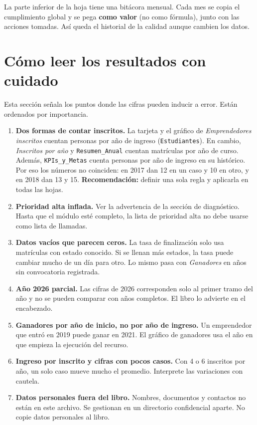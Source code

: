 \documentclass[11pt,a4paper]{article}
\begin{document}
La parte inferior de la hoja tiene una bitácora mensual. Cada mes se copia el cumplimiento global y se pega \textbf{como valor} (no como fórmula), junto con las acciones tomadas. Así queda el historial de la calidad aunque cambien los datos.

\section{Cómo leer los resultados con cuidado}

Esta sección señala los puntos donde las cifras pueden inducir a error. Están ordenados por importancia.

\begin{enumerate}[leftmargin=1.6em]
  \item \textbf{Dos formas de contar inscritos.} La tarjeta y el gráfico de \emph{Emprendedores inscritos} cuentan personas por año de ingreso (\texttt{Estudiantes}). En cambio, \emph{Inscritos por año} y \texttt{Resumen\_Anual} cuentan matrículas por año de curso. Además, \texttt{KPIs\_y\_Metas} cuenta personas por año de ingreso en su histórico. Por eso los números no coinciden: en 2017 dan 12 en un caso y 10 en otro, y en 2018 dan 13 y 15. \textbf{Recomendación:} definir una sola regla y aplicarla en todas las hojas.
  \item \textbf{Prioridad alta inflada.} Ver la advertencia de la sección de diagnóstico. Hasta que el módulo esté completo, la lista de prioridad alta no debe usarse como lista de llamadas.
  \item \textbf{Datos vacíos que parecen ceros.} La tasa de finalización solo usa matrículas con estado conocido. Si se llenan más estados, la tasa puede cambiar mucho de un día para otro. Lo mismo pasa con \emph{Ganadores} en años sin convocatoria registrada.
  \item \textbf{Año 2026 parcial.} Las cifras de 2026 corresponden solo al primer tramo del año y no se pueden comparar con años completos. El libro lo advierte en el encabezado.
  \item \textbf{Ganadores por año de inicio, no por año de ingreso.} Un emprendedor que entró en 2019 puede ganar en 2021. El gráfico de ganadores usa el año en que empieza la ejecución del recurso.
  \item \textbf{Ingreso por inscrito y cifras con pocos casos.} Con 4 o 6 inscritos por año, un solo caso mueve mucho el promedio. Interprete las variaciones con cautela.
  \item \textbf{Datos personales fuera del libro.} Nombres, documentos y contactos no están en este archivo. Se gestionan en un directorio confidencial aparte. No copie datos personales al libro.
\end{enumerate}
\end{document}
